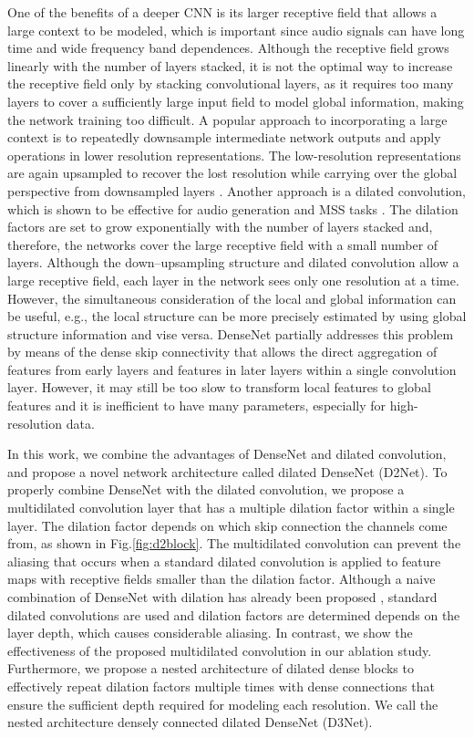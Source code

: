 \documentclass{article}
\begin{document}
One of the benefits of a deeper CNN is its larger receptive field that allows a large context to be modeled, which is important since audio signals can have long time and wide frequency band dependences. 
Although the receptive field grows linearly with the number of layers stacked, it is not the optimal way to increase the receptive field only by stacking convolutional layers, as it requires too many layers to cover a sufficiently large input field to model global information, making the network training too difficult. 
A popular approach to incorporating a large context is to repeatedly downsample intermediate network outputs and apply operations in lower resolution representations. The low-resolution representations are again upsampled to recover the lost resolution while carrying over the global perspective from downsampled layers \cite{Takahashi17, Stoller18WavU, defossez2019demucs, Takahashi18MMDenseLSTM}. 
Another approach is a dilated convolution, which is shown to be effective for audio generation and MSS tasks \cite{Aaron2016WN, defossez2019demucs,Liu19}. The dilation factors are set to grow exponentially with the number of layers stacked and, therefore, the networks cover the large receptive field with a small number of layers.
Although the down--upsampling structure and dilated convolution allow a large receptive field, each layer in the network sees only one resolution at a time. However, the simultaneous consideration of  the local and global information can be useful, e.g., the local structure can be more precisely estimated by using global structure information and vise versa.
DenseNet partially addresses this problem by means of the dense skip connectivity that allows the direct aggregation of features from early layers and features in later layers within a single convolution layer.
However, it may still be too slow to transform local features to global features and it is inefficient to have many parameters, especially for high-resolution data.

In this work, we combine the advantages of DenseNet and dilated convolution, and propose a novel network architecture called dilated DenseNet (D2Net). To properly combine DenseNet with the dilated convolution, we propose a multidilated convolution layer that has a multiple dilation factor within a single layer. The dilation factor depends on which skip connection the channels come from, as shown in Fig.\ref{fig:d2block}. The multidilated convolution can prevent the aliasing that occurs when a standard dilated convolution is applied to feature maps with receptive fields smaller than the dilation factor. Although a naive combination of DenseNet with dilation has already been proposed \cite{Fuchs19}, standard dilated convolutions are used and dilation factors are determined depends on the layer depth, which causes considerable aliasing. In contrast, we show the effectiveness of the proposed multidilated convolution in our ablation study.
Furthermore, we propose a nested architecture of dilated dense blocks to effectively repeat dilation factors multiple times with dense connections that ensure the sufficient depth required for modeling each resolution. 
We call the nested architecture densely connected dilated DenseNet (D3Net).
\end{document}
